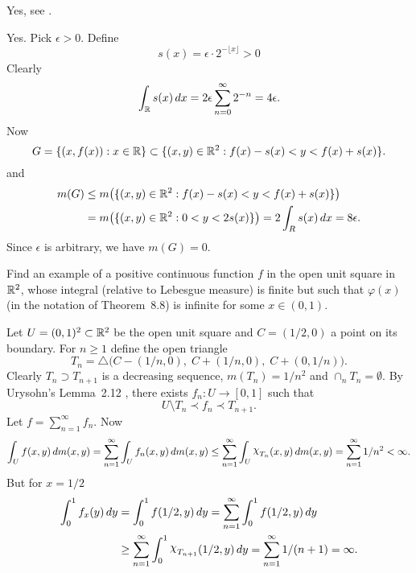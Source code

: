 \begin{enumerate}
\begin{itemize}
Yes, see .

Yes.
Pick \(\epsilon>0\). Define
\begin{equation*}
s(x) = \epsilon \cdot 2 ^{-\lfloor x \rfloor} > 0
\end{equation*}
Clearly 
\begin{equation*}
\int_{\mathbb{R}} s(x)\,dx = 2 \epsilon \sum_{n=0}^\infty 2^{-n} = 4\epsilon.
\end{equation*}
Now 
\begin{equation*}
G 
= \{(x,f(x)): x\in\mathbb{R}\} 
\subset \{(x,y)\in\mathbb{R}^2: f(x)-s(x) < y < f(x)+s(x)\}.
\end{equation*}
and 
\begin{align*}
m(G) 
&\leq m\bigl(\{(x,y)\in\mathbb{R}^2: f(x)-s(x) < y < f(x)+s(x)\}\bigr) \\
&=  m\bigl(\{(x,y)\in\mathbb{R}^2: 0 < y < 2s(x)\}\bigr)
= 2\int_R s(x)\,dx = 8\epsilon.
\end{align*}
Since \(\epsilon\) is arbitrary, we have \(m(G)=0\).
\end{itemize}


\begin{excopy}
Find an example of a positive continuous function $f$
in the open unit square in \(\mathbb{R}^2\),
whose integral (relative to Lebesgue measure)
is finite but such that \(\varphi(x)\) 
(in the notation of Theorem~8.8)
is infinite for some \(x \in (0,1)\).
\end{excopy}

Let \(U = (0,1)^2 \subset \mathbb{R}^2\) be the open unit square
and \(C = (1/2,0)\) a point on its boundary.
For \(n\geq 1\) define the open triangle
\begin{equation*}
T_n = \triangle\bigl(C-(1/n, 0),\; C+(1/n, 0),\; C+(0, 1/n)\bigr).
\end{equation*}
Clearly \(T_n \supset T_{n+1}\) is a decreasing sequence, 
\(m(T_n) = 1/n^2\) and \(\cap_n T_n = \emptyset\).
By  Urysohn's Lemma~2.12 \cite{RudinRCA87}, 
there exists
\(f_n:U\to[0,1]\) such that 
\begin{equation*}
U \setminus T_n \prec f_n \prec T_{n+1}.
\end{equation*}
Let \(f = \sum_{n=1}^\infty f_n\).
Now
\begin{equation*}
\int_U f(x,y)\,dm(x,y)
= \sum_{n=1}^\infty \int_U f_n(x,y)\,dm(x,y)
\leq \sum_{n=1}^\infty \int_U \chhi_{T_n}(x,y)\,dm(x,y)
= \sum_{n=1}^\infty 1/n^2
< \infty.
\end{equation*}
But for \(x=1/2\)
\begin{align*}
\int_0^1 f_x(y)\,dy 
&= \int_0^1 f(1/2,y)\,dy
= \sum_{n=1}^\infty \int_0^1 f(1/2,y)\,dy \\
&\geq \sum_{n=1}^\infty \int_0^1 \chhi_{T_{n+1}}(1/2,y)\,dy
= \sum_{n=1}^\infty 1/(n+1)
= \infty.
\end{align*}
 


\end{enumerate}
